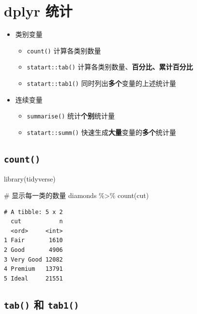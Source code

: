 \documentclass[
  letterpaper,
]{ctexbook}
\newenvironment{Shaded}{\begin{snugshade}}{\end{snugshade}}
\newcommand{\CommentTok}[1]{\textcolor[rgb]{0.37,0.37,0.37}{#1}}
\newcommand{\FunctionTok}[1]{\textcolor[rgb]{0.28,0.35,0.67}{#1}}
\newcommand{\NormalTok}[1]{\textcolor[rgb]{0.00,0.23,0.31}{#1}}
\newcommand{\SpecialCharTok}[1]{\textcolor[rgb]{0.37,0.37,0.37}{#1}}
\providecommand{\tightlist}{%
  \setlength{\itemsep}{0pt}\setlength{\parskip}{0pt}}\usepackage{longtable,booktabs,array}
\begin{document}
\hypertarget{dplyr-ux7edfux8ba1}{%
\chapter{dplyr 统计}\label{dplyr-ux7edfux8ba1}}

\begin{itemize}
\tightlist
\item
  类别变量

  \begin{itemize}
  \tightlist
  \item
    \texttt{count()} 计算各类别数量
  \item
    \texttt{statart::tab()}
    计算各类别数量、{\textbf{百分比、累计百分比}}
  \item
    \texttt{statart::tab1()} 同时列出{\textbf{多个}}变量的上述统计量
  \end{itemize}
\item
  连续变量

  \begin{itemize}
  \tightlist
  \item
    \texttt{summarise()} 统计{\textbf{个别}}统计量
  \item
    \texttt{statart::summ()}
    快速生成{\textbf{大量}}变量的{\textbf{多个}}统计量
  \end{itemize}
\end{itemize}

\hypertarget{count}{%
\section{\texorpdfstring{\texttt{count()}}{count()}}\label{count}}

\begin{Shaded}
\begin{Highlighting}[]
\FunctionTok{library}\NormalTok{(tidyverse)}

\CommentTok{\# 显示每一类的数量}
\NormalTok{diamonds }\SpecialCharTok{\%\textgreater{}\%}
  \FunctionTok{count}\NormalTok{(cut)}
\end{Highlighting}
\end{Shaded}

\begin{verbatim}
# A tibble: 5 x 2
  cut           n
  <ord>     <int>
1 Fair       1610
2 Good       4906
3 Very Good 12082
4 Premium   13791
5 Ideal     21551
\end{verbatim}

\hypertarget{tab-ux548c-tab1}{%
\section{\texorpdfstring{\texttt{tab()} 和
\texttt{tab1()}}{tab() 和 tab1()}}\label{tab-ux548c-tab1}}
\end{document}
